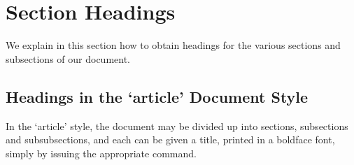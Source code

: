 \documentclass[a4paper,10pt]{article}
\begin{document}
\section{Section Headings}

We explain in this section how to obtain headings
for the various sections and subsections of our
document.

\subsection{Headings in the `article' Document Style}

In the `article' style, the document may be divided up
into sections, subsections and subsubsections, and each
can be given a title, printed in a boldface font,
simply by issuing the appropriate command.
\end{document}

